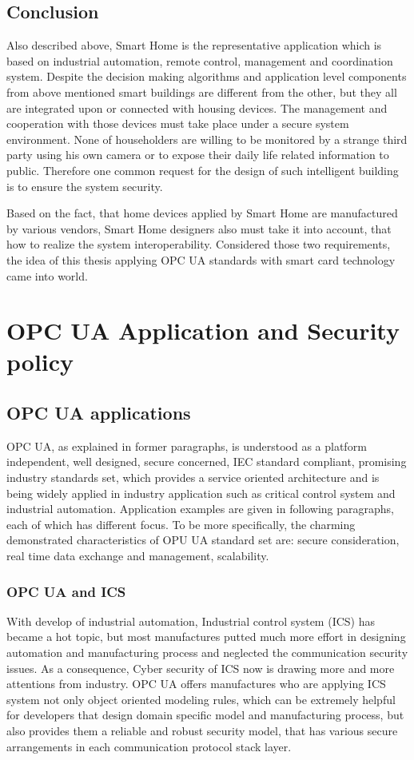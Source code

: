 \subsection{Conclusion}
Also described above, Smart Home is the representative application which is based on industrial automation, remote control, management and coordination system. Despite the decision making algorithms and application level components from above mentioned smart buildings are different from the other, but they all are integrated upon or connected with housing devices. The management and cooperation with those devices must take place under a secure system environment. None of householders are willing to be monitored by a strange third party using his own camera or to expose their daily life related information to public. Therefore one common request for the design of such intelligent building is to ensure the system security.

Based on the fact, that home devices applied by Smart Home are manufactured by various vendors,  Smart Home designers also must take it into account, that how to realize the system interoperability. Considered those two requirements, the idea of this thesis applying OPC UA standards with smart card technology came into world. 

\section{OPC UA Application and Security policy }

\subsection{OPC UA applications}
OPC UA, as explained in former paragraphs,  is understood as a platform independent, well designed, secure concerned, IEC standard compliant, promising industry standards set, which provides a service oriented architecture and is being widely applied in industry application such as critical control system and industrial automation. Application examples are given in following paragraphs, each of which has different focus. To be more specifically, the charming demonstrated characteristics of OPU UA standard set are: secure consideration, real time data exchange and management, scalability. 

\subsubsection{OPC UA and ICS}
With develop of industrial automation, Industrial control system (ICS) has became a hot topic, but most manufactures putted much more effort in designing automation and manufacturing process and neglected the communication security issues. As a consequence, Cyber security of ICS now is drawing more and more attentions from industry. OPC UA offers manufactures who are applying ICS system not only object oriented modeling rules, which can be extremely helpful for developers that design domain specific model and manufacturing process, but also provides them a reliable and robust security model\cite{opc_ics}, that has various secure arrangements in each communication protocol stack layer.


